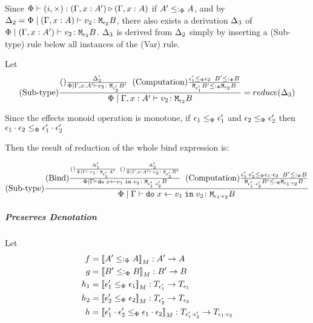 \documentclass{report}
\begin{document}
                Since $\Phi\vdash (i,\times) : (\Gamma, x: A') \triangleright (\Gamma, x: A)$ if $A' \leq:_\Phi A$, and by $\Delta_2 = \Phi\mid(\Gamma, x: A) \vdash v_2 \colon \texttt{M}_{\epsilon_2}{B}$, there also exists a derivation $\Delta_3$ of $\Phi\mid(\Gamma, x: A') \vdash v_2 \colon \texttt{M}_{\epsilon_2}{B}$. $\Delta_3$ is derived from $\Delta_2$ simply by inserting a (Sub-type) rule below all instances of the (Var) rule.

                Let \begin{equation}
                    (\text{Sub-type}) \frac{
                        (\text{}) \frac{\Delta'_3}{\Phi\mid\Gamma, x: A' \vdash v_2 \colon \texttt{M}_{\epsilon'_2}{B'}}
                    \;\;
                    (\text{Computation}) \frac{ \epsilon_1'\leq_{\Phi} \epsilon_2\;\; B' \leq:_\Phi B }{\texttt{M}_{\epsilon_1'}{ B' }\leq:_\Phi\texttt{M}_{\epsilon_2}{B}}
                    }{
                        \Phi\mid\Gamma, x: A' \vdash v_2 \colon \texttt{M}_{\epsilon_2}{B}
                    } = reduce(\Delta_3)
                \end{equation}
                

                Since the effects monoid operation is monotone, if $\epsilon_1\leq_{\Phi}\epsilon_1'$ and $\epsilon_2\leq_{\Phi}\epsilon_2'$ then $\epsilon_1\cdot\epsilon_2 \leq_{\Phi} \epsilon_1'\cdot\epsilon_2'$
                


                Then the result of reduction of the whole bind expression is:


                \begin{equation}
                    (\text{Sub-type}) \frac{
                        (\text{Bind}) \frac{
                            (\text{}) \frac{
                                \Delta'_1
                            }{
                                \Phi\mid\Gamma \vdash v_1 \colon \texttt{M}_{\epsilon_1'}{A'}
                            }
                            \;\;
                            (\text{}) \frac{
                                \Delta'_3
                            }{
                                \Phi\mid\Gamma, x: A' \vdash v_2 \colon \texttt{M}_{\epsilon_2'}{B'}
                            }
                        }{
                        \Phi\mid\Gamma \vdash \texttt{do}\; x \leftarrow v_1 \;\texttt{in}\; v_2 \colon \texttt{M}_{\epsilon_1'\cdot\epsilon_2'}{B}
                        }
                        \;\;
                        (\text{Computation}) \frac{ \epsilon_1'\cdot\epsilon_2'\leq_{\Phi} \epsilon_1\cdot\epsilon_2\;\; B' \leq:_\Phi B }{\texttt{M}_{\epsilon_1'\cdot\epsilon_2'}{ B' }\leq:_\Phi\texttt{M}_{\epsilon_1\cdot\epsilon_2}{B}}
                    }{
                        \Phi\mid\Gamma \vdash \texttt{do}\; x \leftarrow v_1 \;\texttt{in}\; v_2 \colon \texttt{M}_{\epsilon_1\cdot\epsilon_2}{B}
                    }
                \end{equation}
                \subparagraph{Preserves Denotation}

                Let \begin{align}
                    f & = \deno{A' \subtypep A}: A' \rightarrow A\\
                    g & = \deno{B' \subtypep B}: B' \rightarrow B\\
                    h_1 & = \deno{\e_1' \subeffectp \e_1} : \T{\e_1'}{} \rightarrow \T{\e_1}{} \\
                    h_2 & = \deno{\e_2'\subeffectp \e_2}:\T{\e_2'}{} \rightarrow \T{\e_2}{}\\
                    h & = \deno{\e_1'\dot\e_2'\subeffectp\e_1\dot\e_2}: \T{\e_1'\dot\e_2'}{}\rightarrow \T{\e_1\dot\e_2}{}
                \end{align}
\end{document}
